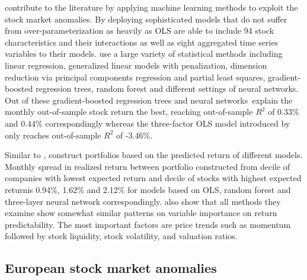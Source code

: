 \documentclass[12pt]{article}
\begin{document}
 \citet{guetal} contribute to the literature by applying machine learning methods to exploit the stock market anomalies. By deploying sophisticated models that do not suffer from over-parameterization as heavily as OLS \citeauthor{guetal} are able to include 94 stock characteristics and their interactions as well as eight aggregated time series variables to their models. \citeauthor{guetal} use a large variety of statistical methods including linear regression, generalized linear models with penalization, dimension reduction via principal components regression and partial least squares, gradient-boosted regression trees, random forest and different settings of neural networks. Out of these gradient-boosted regression trees and neural networks\footnotemark \ explain the monthly out-of-sample stock return the best, reaching out-of-sample $R^{2}$ of 0.33\% and 0.44\% correspondingly whereas the three-factor OLS model introduced by \citet{Lewellen2015} only reaches out-of-sample $R^{2}$ of -3.46\%. \par


Similar to \citet{Lewellen2015}, \citeauthor{guetal} construct portfolios based on the predicted return of different models. Monthly spread in realized return between portfolio constructed from decile of companies with lowest expected return and decile of stocks with highest expected return\footnotemark is 0.94\%, 1.62\% and 2.12\% for models based on OLS, random forest and three-layer neural network correspondingly. \citeauthor{guetal} also show that all methods they examine show somewhat similar patterns on variable importance on return predictability. The most important factors are price trends such as momentum followed by stock liquidity, stock volatility, and valuation ratios. \par


\subsection{European stock market anomalies}\label{EuropeanStockMarketAnomalies}
\end{document}

